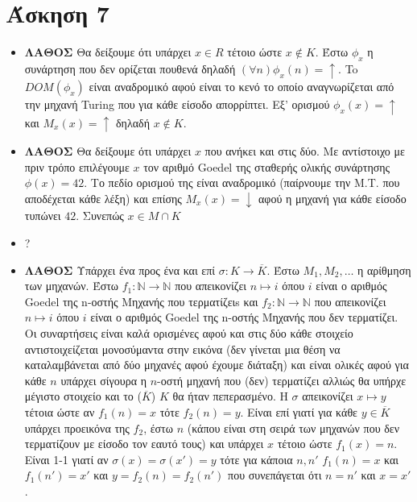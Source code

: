 \documentclass[11pt]{article}
\begin{document}



\section*{Άσκηση 7}
\begin{itemize}
  \item \textbf{ΛΑΘΟΣ} Θα δείξουμε ότι υπάρχει $x\in R$ τέτοιο ώστε $x\notin K$. Έστω
    $\phi_x$ η συνάρτηση που δεν ορίζεται πουθενά δηλαδή $(\forall n)\phi_x(n)=\uparrow$. To 
    $DOM(\phi_x)$ είναι αναδρομικό αφού είναι το κενό το οποίο αναγνωρίζεται από την μηχανή
    Turing που για κάθε είσοδο απορρίπτει. Εξ' ορισμού $\phi_x(x)=\uparrow$ και $M_x(x)=\uparrow$
    δηλαδή $x\notin K$.
  \item \textbf{ΛΑΘΟΣ} Θα δείξουμε ότι υπάρχει $x$ που ανήκει και στις δύο. Με αντίστοιχο με πριν
    τρόπο επιλέγουμε $x$ τον αριθμό Goedel της σταθερής ολικής συνάρτησης $\phi(x)=42$. Το πεδίο
    ορισμού της είναι αναδρομικό (παίρνουμε την Μ.T. που αποδέχεται κάθε λέξη) και επίσης $M_x(x)=\downarrow$
    αφού η μηχανή για κάθε είσοδο τυπώνει $42$. Συνεπώς $x\in M\cap K$ 
  \item ?
  \item \textbf{ΛΑΘΟΣ} Υπάρχει ένα προς ένα και επί $\sigma:K\rightarrow\overline{K}$. Έστω $M_1,M_2,\ldots$
    η αρίθμηση των μηχανών. Έστω $f_1:\mathbb{N}\rightarrow \mathbb{N}$ που απεικονίζει $n\mapsto i$ όπου $i$ είναι 
    ο αριθμός Goedel της n-οστής Μηχανής που τερματίζειs και $f_2:\mathbb{N}\rightarrow \mathbb{N}$ που απεικονίζει
    $n\mapsto i$ όπου $i$ είναι ο αριθμός Goedel της n-οστής Μηχανής που δεν τερματίζει. Οι συναρτήσεις είναι καλά
    ορισμένες αφού και στις δύο κάθε στοιχείο αντιστοιχείζεται μονοσύμαντα στην εικόνα (δεν γίνεται μια θέση να 
    καταλαμβάνεται από δύο μηχανές αφού έχουμε διάταξη)
    και είναι ολικές αφού για κάθε $n$ υπάρχει σίγουρα η $n$-οστή μηχανή που (δεν)
    τερματίζει αλλιώς θα υπήρχε μέγιστο στοιχείο και το ($\overline{K}$) $K$ θα ήταν πεπερασμένο. 
    Η $\sigma$ απεικονίζει $x\mapsto y$ τέτοια ώστε αν $f_1(n)=x$ τότε $f_2(n)=y$. Είναι επί γιατί για κάθε 
    $y\in\overline{K}$ υπάρχει προεικόνα της $f_2$, έστω $n$ (κάπου είναι στη σειρά των μηχανών που δεν τερματίζουν με είσοδο τον
    εαυτό τους) και υπάρχει $x$ τέτοιο ώστε $f_1(x) = n$. Είναι 1-1 γιατί αν $\sigma(x)=\sigma(x')=y$ τότε για κάποια $n,n'$ 
    $f_1(n)=x$ και $f_1(n')=x'$ και $y=f_2(n)=f_2(n')$ που συνεπάγεται ότι $n=n'$ και $x=x'$.
\end{itemize}
\end{document}
